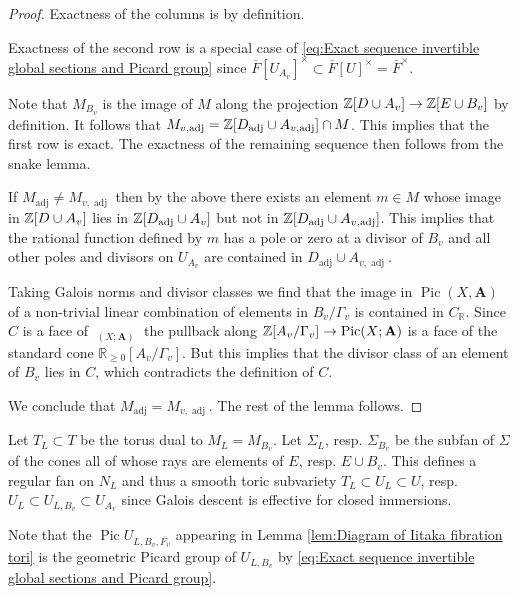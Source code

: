 \documentclass[a4paper,11pt,reqno]{amsart}
\newcommand{\R}{\mathbb{R}}
\DeclareMathOperator{\Pic}{Pic}
\DeclareMathOperator{\Eff}{\overline{Eff}}
\DeclareMathOperator{\adj}{adj}
\theoremstyle{definition}
\begin{document}
\begin{proof}
	Exactness of the columns is by definition.
	
	Exactness of the second row is a special case of \eqref{eq:Exact sequence invertible global sections and Picard group} since $\overline{F}[U_{A_v}]^{\times} \subset \overline{F}[U]^{\times} = \overline{F}^{\times}$.
	
	Note that $M_{B_v}$ is the image of $M$ along the projection $\mathbb{Z}[D \cup A_v] \to \mathbb{Z}[E \cup B_v]$ by definition. It follows that $M_{v, \adj} = \Z[D_{\adj} \cup A_{v, \adj}] \cap M$. This implies that the first row is exact. The exactness of the remaining sequence then follows from the snake lemma.
	
	If $M_{\adj} \neq M_{v, \adj}$ then by the above there exists an element $m \in M$ whose image in $\mathbb{Z}[D \cup A_v]$ lies in $\Z[D_{\adj} \cup A_v]$ but not in $\Z[D_{\adj} \cup A_{v, \adj}]$. This implies that the rational function defined by $m$ has a pole or zero at a divisor of $B_v$ and all other poles and divisors on $U_{A_v}$ are contained in $D_{\adj} \cup A_{v, \adj}$.
	
	Taking Galois norms and divisor classes we find that the image in $\Pic(X, \mathbf{A})$ of a non-trivial linear combination of elements in $B_v/ \Gamma_v$ is contained in $C_{\R}$. Since $C$ is a face of $\Eff_{(X ; \mathbf{A})}$ the pullback along $\Z[A_v / \Gamma_v] \to \Pic(X ; \mathbf{A})$ is a face of the standard cone $\R_{\geq 0}[A_v / \Gamma_v]$. But this implies that the divisor class of an element of $B_v$ lies in $C$, which contradicts the definition of $C$. 
	
	We conclude that $M_{\adj} = M_{v, \adj}$. The rest of the lemma follows.
\end{proof}

Let $T_L \subset T$ be the torus dual to $M_L = M_{B_v}$. Let $\Sigma_L$, resp. $\Sigma_{B_v}$ be the subfan of $\Sigma$ of the cones all of whose rays are elements of $E$, resp. $E \cup B_v$. This defines a regular fan on $N_L$ and thus a smooth toric subvariety $T_L \subset U_L \subset U$, resp. $U_L \subset U_{L, B_v} \subset U_{A_v}$ since Galois descent is effective for closed immersions.

Note that the $\Pic U_{L, B_v, \overline{F_v}}$ appearing in Lemma \ref{lem:Diagram of Iitaka fibration tori} is the geometric Picard group of $U_{L, B_v}$ by \eqref{eq:Exact sequence invertible global sections and Picard group}.
\end{document}
